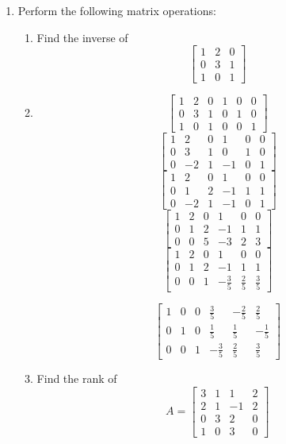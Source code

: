 \documentclass[11pt]{article}
\begin{document}
\begin{enumerate}
\begin{enumerate}
\item Find any asymptotes that $f$ may have.
\item[] The function approaches y=x on the left and an asymptote at the right at the x-axis.

\end{enumerate}

\item Perform the following matrix operations:

\begin{enumerate}
\item Find the inverse of $$\begin{bmatrix}1 & 2& 0\\ 0& 3& 1\\1&0&1
\end{bmatrix}$$
\item[] 
$$\begin{bmatrix}1 & 2& 0&1&0&0\\ 0& 3& 1&0&1&0\\1&0&1&0&0&1
\end{bmatrix}$$
$$\begin{bmatrix}1 & 2& 0&1&0&0\\ 
0& 3& 1&0&1&0\\
0&-2&1&-1&0&1
\end{bmatrix}$$
$$\begin{bmatrix}1 & 2& 0&1&0&0\\ 
0& 1& 2&-1&1&1\\
0&-2&1&-1&0&1
\end{bmatrix}$$
$$\begin{bmatrix}1 & 2& 0&1&0&0\\ 
0& 1& 2&-1&1&1\\
0&0&5&-3&2&3
\end{bmatrix}$$
$$\begin{bmatrix}1 & 2& 0&1&0&0\\ 
0& 1& 2&-1&1&1\\
0&0&1&-\frac{3}{5}&\frac{2}{5}&\frac{3}{5}
\end{bmatrix}$$

$$\begin{bmatrix}
1 & 0& 0&\frac{3}{5}&-\frac{2}{5}&\frac{2}{5}\\ 
0& 1& 0&\frac{1}{5}&\frac{1}{5}&-\frac{1}{5}\\
0&0&1&-\frac{3}{5}&\frac{2}{5}&\frac{3}{5}
\end{bmatrix}$$




\item Find the rank of 
$$A=\begin{bmatrix} 
3& 1& 1&2\\
2& 1& -1&2\\
0& 3& 2&0\\
1& 0& 3&0
\end{bmatrix}$$


\end{enumerate}
\end{enumerate}
\end{document}
